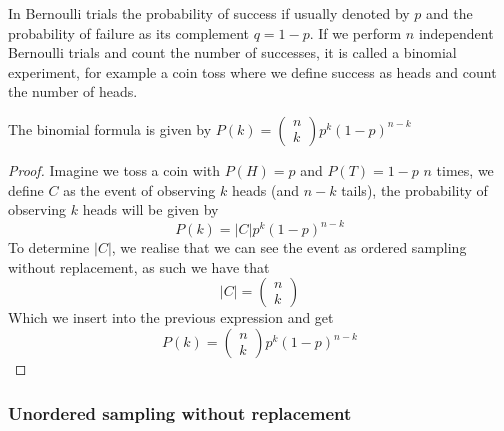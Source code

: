 In Bernoulli trials the probability of success if usually denoted by $p$ and the probability of failure as its complement $q=1-p$. If we perform $n$ independent Bernoulli trials and count the number of successes, it is called a binomial experiment, for example a coin toss where we define success as heads and count the number of heads. 
\begin{theorem}
    The binomial formula is given by $P(k)=\begin{pmatrix}n\\k\end{pmatrix}p^{k}(1-p)^{n-k}$
\end{theorem}
\begin{proof}
    Imagine we toss a coin with $P(H)=p$ and $P(T)=1-p$ $n$ times, we define $C$ as the event of observing $k$ heads (and $n-k$ tails), the probability of observing $k$ heads will be given by
    \[
        P(k)=|C|p^{k}(1-p)^{n-k}
    \]
    To determine $|C|$, we realise that we can see the event as ordered sampling without replacement, as such we have that
    \[
        |C|=\begin{pmatrix}n\\k\end{pmatrix}
    \]
    Which we insert into the previous expression and get
    \[
        P(k)=\begin{pmatrix}n\\k\end{pmatrix}p^{k}(1-p)^{n-k}
    \]
\end{proof}
\subsubsection{Unordered sampling without replacement}
